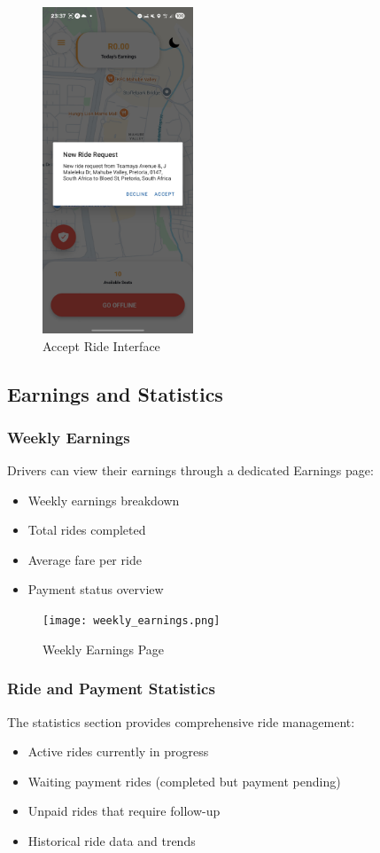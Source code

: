 \documentclass[12pt]{article}
\begin{document}
\begin{figure}[H]
  \centering
  \includegraphics[width=0.4\textwidth]{accept_ride.png}
  \caption{Accept Ride Interface}
\end{figure}

\subsection{Earnings and Statistics}

\subsubsection{Weekly Earnings}
Drivers can view their earnings through a dedicated Earnings page:
\begin{itemize}
    \item Weekly earnings breakdown
    \item Total rides completed
    \item Average fare per ride
    \item Payment status overview
\end{itemize}

\begin{figure}[H]
  \centering
  \texttt{[image: weekly\_earnings.png]}
  \caption{Weekly Earnings Page}
\end{figure}

\subsubsection{Ride and Payment Statistics}
The statistics section provides comprehensive ride management:
\begin{itemize}
    \item Active rides currently in progress
    \item Waiting payment rides (completed but payment pending)
    \item Unpaid rides that require follow-up
    \item Historical ride data and trends
\end{itemize}
\end{document}
